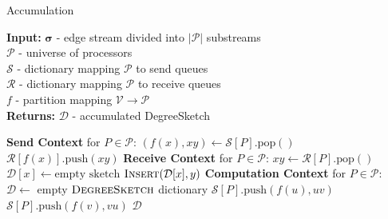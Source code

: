 \documentclass{vldb}
\newcommand{\push}[1]{\text{push} \left ( #1 \right )}
\newcommand{\pop}{\text{pop}()}
\newcommand{\algoname}[1]{\textnormal{\textsc{#1}}}
\begin{document}
\begin{algorithm}[t] 
\caption{Accumulation}\label{alg:ds:accumulation}
\begin{flushleft}
        \textbf{Input:} 		$\boldsymbol{\sigma}$ - edge stream divided into $|\mathcal{P}|$ substreams\\
        	\hspace{3.2em}	$\mathcal{P}$ - universe of processors	 \\
        	\hspace{3.2em}	$\mathcal{S}$ - dictionary mapping $\mathcal{P}$ to send queues	 \\
        	\hspace{3.2em}	$\mathcal{R}$ - dictionary mapping $\mathcal{P}$ to receive queues	 \\
        	\hspace{3.2em}	$f$ - partition mapping $\mathcal{V} \rightarrow \mathcal{P}$	 \\
        \textbf{Returns:} $\mathcal{D}$ - accumulated DegreeSketch
\end{flushleft}
\begin{flushleft}
\begin{algorithmic}[1]
	\Statex \textbf{Send Context} for $P \in \mathcal{P}$:
  			\State $(f(x), xy) \gets \mathcal{S}[P].\pop$
			\State $\mathcal{R}[f(x)].\push{xy}$
  		\EndWhile
	\Statex \textbf{Receive Context} for $P \in \mathcal{P}$:
  			\State $xy \gets \mathcal{R}[P].\pop$
				$\mathcal{D}[x] \gets \text{empty sketch}$
			\EndIf
	  		\State $\algoname{Insert}(\mathcal{D}[x], y)$
  		\EndWhile
	\Statex \textbf{Computation Context} for $P \in \mathcal{P}$:
		\State $\mathcal{D} \gets $ empty $\algoname{DegreeSketch}$ dictionary
 			\State $\mathcal{S}[P].\push{f(u), uv}$
 			\State $\mathcal{S}[P].\push{f(v), vu}$
		\EndWhile
		\State \Return $\mathcal{D}$
\end{algorithmic}
\end{flushleft}
\end{algorithm}
\end{document}
